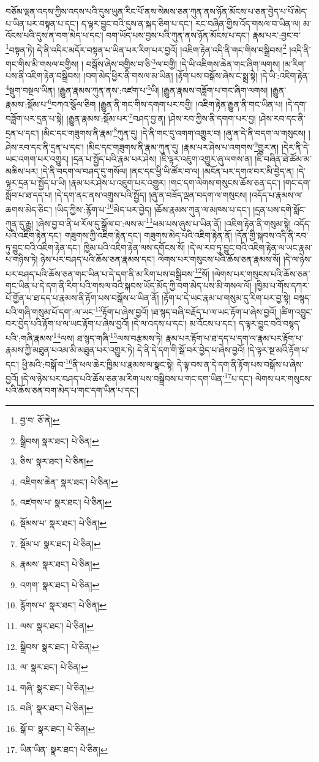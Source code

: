 བཅོམ་ལྡན་འདས་ཀྱིས་འདས་པའི་དུས་ཡུན་རིང་པོ་ནས་སེམས་ཅན་ཀུན་ནས་ཉོན་མོངས་པ་ཅན་བྱེད་པ་པོ་མེད་པ་ཡིན་པར་བསྟན་པ་དང་། ད་ལྟར་བྱུང་བའི་དུས་ན་སྐད་ཅིག་པ་དང་། རང་བཞིན་གྱིས་འོད་གསལ་བ་ཡིན་ལ། མ་འོངས་པའི་དུས་ན་བག་མེད་པ་དང་། བག་ཡོད་པས་བྱས་པའི་ཀུན་ནས་ཉོན་མོངས་པ་དང་། རྣམ་པར་:བྱང་བ་\footnote{བྱ་བ་  ཅོ་ནེ། }བསྟན་ཏེ། དེ་ནི་འདིར་མདོར་བསྟན་པ་ཡིན་པར་རིག་པར་བྱའོ། །འཇིག་རྟེན་འདི་ནི་གང་གིས་བསྒྲིབས།\footnote{སྒྲིབས།  སྣར་ཐང་།  པེ་ཅིན། } །འདི་ནི་གང་གིས་མི་གསལ་བགྱིས། །
བསྒོས་ཞེས་བགྱིས་བ་ཅི་\footnote{ཅིས་  སྣར་ཐང་།  པེ་ཅིན། }ལ་བགྱི། །དེ་ཡི་འཇིགས་ཆེན་གང་ཞིག་ལགས། །མ་རིག་པས་ནི་འཇིག་རྟེན་བསྒྲིབས། །བག་མེད་ཕྱིར་ནི་གསལ་མ་ཡིན། །རྟོག་པས་བསྒོས་ཞེས་ང་སྨྲ་སྟེ། །དེ་ཡི་:འཇིག་རྟེན་\footnote{འཇིགས་ཆེན་  སྣར་ཐང་།  པེ་ཅིན། }སྡུག་བསྔལ་ཡིན། །རྒྱུན་རྣམས་ཀུན་ནས་:འཛག་པ་\footnote{འཛགས་པ་  སྣར་ཐང་།  པེ་ཅིན། }ཡི། །རྒྱུན་རྣམས་བཟློག་པ་གང་ཞིག་ལགས། །རྒྱུན་རྣམས་:སྡོམ་པ་\footnote{སྡོམས་པ་  སྣར་ཐང་།  པེ་ཅིན། }བཀའ་སྩོལ་ཅིག །རྒྱུན་ནི་གང་གིས་དགག་པར་བགྱི། །འཇིག་རྟེན་རྒྱུན་ནི་གང་ཡིན་པ། །དེ་དག་བཟློག་པར་དྲན་པ་སྟེ། །རྒྱུན་རྣམས་:སྡོམ་པར་\footnote{སྡོམ་པ་  སྣར་ཐང་།  པེ་ཅིན། }བཤད་བྱ་ན། །ཤེས་རབ་ཀྱིས་ནི་དགག་པར་བྱ། །ཤེས་རབ་དང་ནི་དྲན་པ་དང་། །མིང་དང་གཟུགས་ནི་རྣམ་\footnote{རྣམས་  སྣར་ཐང་།  པེ་ཅིན། }ཀུན་དུ། །དེ་ནི་གང་དུ་འགག་འགྱུར་བ། །ཞུ་ན་དེ་ནི་བདག་ལ་གསུངས། །ཤེས་རབ་དང་ནི་དྲན་པ་དང་། །མིང་དང་གཟུགས་ནི་རྣམ་ཀུན་དུ། །རྣམ་པར་ཤེས་པ་འགགས་\footnote{འགག་  སྣར་ཐང་།  པེ་ཅིན། }གྱུར་ན། །དེར་ནི་དེ་ཡང་འགག་པར་འགྱུར། །དྲན་པ་སྤྱོད་པའི་རྣམ་པར་ཤེས། །ཇི་ལྟར་འཇུག་འགྱུར་ཞུ་ལགས་ན། །ཇི་བཞིན་ཐེ་ཚོམ་མ་མཆིས་པར། །དེ་ནི་བདག་ལ་བཤད་དུ་གསོལ། །ནང་དང་ཕྱི་ཡི་ཚོར་བ་ལ། །མངོན་པར་དགའ་བར་མི་བྱེད་ན། །དེ་ལྟར་དྲན་པ་སྤྱོད་པ་ཡི། །རྣམ་པར་ཤེས་པ་འཇུག་པར་འགྱུར། །གང་དག་ལེགས་གསུངས་ཆོས་ཅན་དང་། །གང་དག་སློབ་པ་ཐ་དད་པ། །དེ་དག་ནང་ནས་འགྲུས་པའི་སྤྱོད། །ཞུ་ན་བཟོད་ལྡན་བདག་ལ་གསུངས། །འདོད་པ་རྣམས་ལ་ཆགས་མེད་ཅིང་། །ཡིད་ཀྱིས་:རྙོག་པ་\footnote{རྙོགས་པ་  སྣར་ཐང་།  པེ་ཅིན། }མེད་པར་བྱེད། །ཆོས་རྣམས་ཀུན་ལ་མཁས་པ་དང་། །དྲན་པས་དགེ་སློང་ཀུན་དུ་རྒྱུ། །ཞེས་བྱ་བ་ནི་ཕ་རོལ་དུ་སྒྲོལ་བ་:ལས་མ་\footnote{ལས་  སྣར་ཐང་།  པེ་ཅིན། }ཕམ་པས་ཞུས་པ་ཡིན་ནོ། །འཇིག་རྟེན་ནི་གསུམ་སྟེ། འདོད་པའི་འཇིག་རྟེན་དང་། གཟུགས་ཀྱི་འཇིག་རྟེན་དང་། གཟུགས་མེད་པའི་འཇིག་རྟེན་ནོ། །དོན་གྱི་སྐབས་འདི་ནི་རབ་ཏུ་བྱུང་བའི་འཇིག་རྟེན་དང་། ཁྱིམ་པའི་འཇིག་རྟེན་ལས་དགོངས་སོ། །དེ་ལ་རབ་ཏུ་བྱུང་བའི་འཇིག་རྟེན་ལ་ཡང་རྣམ་པ་གཉིས་ཏེ། ཉེས་པར་བཤད་པའི་ཆོས་ཅན་རྣམས་དང་། ལེགས་པར་གསུངས་པའི་ཆོས་ཅན་རྣམས་སོ། །དེ་ལ་ཉེས་པར་བཤད་པའི་ཆོས་ཅན་གང་ཡིན་པ་དེ་དག་ནི་མ་རིག་པས་བསྒྲིབས་\footnote{སྒྲིབས་  སྣར་ཐང་།  པེ་ཅིན། }སོ། །ལེགས་པར་གསུངས་པའི་ཆོས་ཅན་གང་ཡིན་པ་དེ་དག་ནི་རིག་པའི་གསལ་བའི་སྐབས་ཡོད་མོད་ཀྱི་བག་མེད་པས་མི་གསལ་ལོ། །ཁྱིམ་པ་གོས་དཀར་པོ་གྱོན་པ་ཐ་དད་པ་རྣམས་ནི་རྟོག་པས་བསྒོས་པ་ཡིན་ནོ། །རྟོག་པ་དེ་ཡང་རྣམ་པ་གསུམ་དུ་རིག་པར་བྱ་སྟེ། བསྙད་པའི་གཞི་གསུམ་པོ་དག་:ལ་ཡང་\footnote{ལ་  སྣར་ཐང་།  པེ་ཅིན། }རྟོག་པ་ཞེས་བྱའོ། །ཐ་སྙད་བཞི་བརྗོད་པ་ལ་ཡང་རྟོག་པ་ཞེས་བྱའོ། །ཚིག་འབྱུང་བར་བྱེད་པའི་རྟོག་པ་ལ་ཡང་རྟོག་པ་ཞེས་བྱའོ། །དེ་ལ་འདས་པ་དང་། མ་འོངས་པ་དང་། ད་ལྟར་བྱུང་བའི་བསྙད་པའི་:གཞི་རྣམས་\footnote{གཞི་  སྣར་ཐང་།  པེ་ཅིན། }ལས། ཐ་སྙད་གཞི་\footnote{བཞི་  སྣར་ཐང་།  པེ་ཅིན། }ལས་བརྩམས་ཏེ། རྣམ་པར་རྟོག་པ་ཐ་དད་པ་དག་ལ་རྣམ་པར་རྟོག་པ་རྣམས་ཀྱི་མཐུན་པའམ་མི་མཐུན་པར་འགྱུར་ཏེ། དེ་ནི་དེ་དག་གི་སྒོ་བར་བྱེད་པ་ཞེས་བྱའོ། །དེ་ལྟར་སྔ་མའི་རྟོག་པ་དང་། ཕྱི་མའི་:བསྒོ་བ་\footnote{སྒོ་བ་  སྣར་ཐང་།  པེ་ཅིན། }ནི་ཕལ་ཆེར་ཁྱིམ་པ་རྣམས་ལ་སྣང་སྟེ། དེ་ལྟ་བས་ན་དེ་དག་ནི་རྟོག་པས་བསྒོས་པ་ཞེས་བྱའོ། །དེ་ལ་ཉེས་པར་བཤད་པའི་ཆོས་ཅན་མ་རིག་པས་བསྒྲིབས་པ་གང་དག་ཡིན་\footnote{ཡིན་ཡིན་  སྣར་ཐང་།  པེ་ཅིན། }པ་དང་། ལེགས་པར་གསུངས་པའི་ཆོས་ཅན་བག་མེད་པ་གང་དག་ཡིན་པ་དང་། 